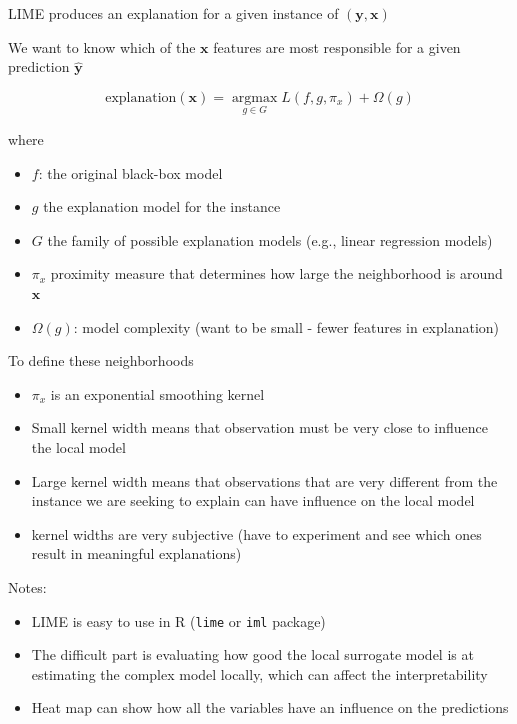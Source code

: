 \documentclass[
]{book}
\begin{document}
LIME produces an explanation for a given instance of \((\mathbf{y,x})\)

We want to know which of the \(\mathbf{x}\) features are most responsible for a given prediction \(\mathbf{\hat{y}}\)

\[
\text{explanation}(\mathbf{x}) = \underset{g \in G}{\operatorname{argmax}} L (f, g, \pi_x) + \Omega(g)
\]

where

\begin{itemize}
\item
  \(f\): the original black-box model
\item
  \(g\) the explanation model for the instance
\item
  \(G\) the family of possible explanation models (e.g., linear regression models)
\item
  \(\pi_x\) proximity measure that determines how large the neighborhood is around \(\mathbf{x}\)
\item
  \(\Omega(g)\): model complexity (want to be small - fewer features in explanation)
\end{itemize}

To define these neighborhoods

\begin{itemize}
\item
  \(\pi_x\) is an exponential smoothing kernel
\item
  Small kernel width means that observation must be very close to influence the local model
\item
  Large kernel width means that observations that are very different from the instance we are seeking to explain can have influence on the local model
\item
  kernel widths are very subjective (have to experiment and see which ones result in meaningful explanations)
\end{itemize}

Notes:

\begin{itemize}
\item
  LIME is easy to use in R (\texttt{lime} or \texttt{iml} package)
\item
  The difficult part is evaluating how good the local surrogate model is at estimating the complex model locally, which can affect the interpretability
\item
  Heat map can show how all the variables have an influence on the predictions
\end{itemize}
\end{document}
